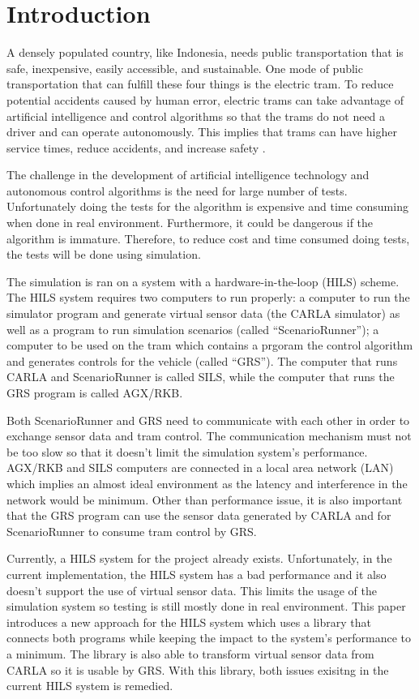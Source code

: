 \section{Introduction}

A densely populated country, like Indonesia, needs public transportation that is
safe, inexpensive, easily accessible, and sustainable. One mode of public
transportation that can fulfill these four things is the electric tram. To
reduce potential accidents caused by human error, electric trams can take
advantage of artificial intelligence and control algorithms so that the trams do
not need a driver and can operate autonomously. This implies that trams can have
higher service times, reduce accidents, and increase safety
\cite{trilaksono_laporanRispro}.

The challenge in the development of artificial intelligence technology and
autonomous control algorithms is the need for large number of tests.
Unfortunately doing the tests for the algorithm is expensive and time consuming
when done in real environment. Furthermore, it could be dangerous if the
algorithm is immature. Therefore, to reduce cost and time consumed doing tests,
the tests will be done using simulation.

The simulation is ran on a system with a hardware-in-the-loop (HILS) scheme. The
HILS system requires two computers to run properly: a computer to run the
simulator program and generate virtual sensor data (the CARLA simulator) as well
as a program to run simulation scenarios (called ``ScenarioRunner''); a computer
to be used on the tram which contains a prgoram the control algorithm and
generates controls for the vehicle (called ``GRS''). The computer that runs
CARLA and ScenarioRunner is called SILS, while the computer that runs the GRS
program is called AGX/RKB.

Both ScenarioRunner and GRS need to communicate with each other in order to
exchange sensor data and tram control. The communication mechanism must not be
too slow so that it doesn't limit the simulation system's performance. AGX/RKB
and SILS computers are connected in a local area network (LAN) which implies an
almost ideal environment as the latency and interference in the network would be
minimum. Other than performance issue, it is also important that the GRS program
can use the sensor data generated by CARLA and for ScenarioRunner to consume
tram control by GRS.

Currently, a HILS system for the project already exists. Unfortunately, in the
current implementation, the HILS system has a bad performance and it also
doesn't support the use of virtual sensor data. This limits the usage of the
simulation system so testing is still mostly done in real environment. This
paper introduces a new approach for the HILS system which uses a library that
connects both programs while keeping the impact to the system's performance to a
minimum. The library is also able to transform virtual sensor data from CARLA so
it is usable by GRS.  With this library, both issues exisitng in the current
HILS system is remedied.

